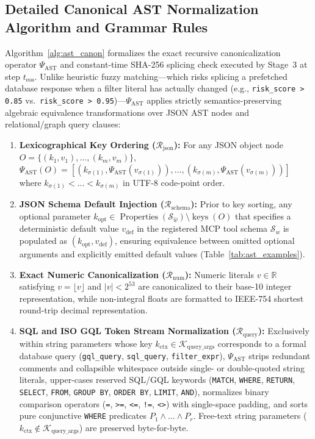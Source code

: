 \documentclass[10pt,conference]{IEEEtran}
\begin{document}
\subsection{Detailed Canonical AST Normalization Algorithm and Grammar Rules}
Algorithm~\ref{alg:ast_canon} formalizes the exact recursive canonicalization operator $\Psi_{\text{AST}}$ and constant-time SHA-256 splicing check executed by Stage~3 at step $t_{\text{eos}}$. Unlike heuristic fuzzy matching---which risks splicing a prefetched database response when a filter literal has actually changed (e.g., \texttt{risk\_score > 0.85} vs.\ \texttt{risk\_score > 0.95})---$\Psi_{\text{AST}}$ applies strictly semantics-preserving algebraic equivalence transformations over JSON AST nodes and relational/graph query clauses:
\begin{enumerate}
    \item \textbf{Lexicographical Key Ordering ($\mathcal{R}_{\text{json}}$):} For any JSON object node $O = \{(k_1, v_1), \dots, (k_m, v_m)\}$, $\Psi_{\text{AST}}(O) = [(k_{\sigma(1)}, \Psi_{\text{AST}}(v_{\sigma(1)})), \dots, (k_{\sigma(m)}, \Psi_{\text{AST}}(v_{\sigma(m)}))]$ where $k_{\sigma(1)} < \dots < k_{\sigma(m)}$ in UTF-8 code-point order.
    \item \textbf{JSON Schema Default Injection ($\mathcal{R}_{\text{schema}}$):} Prior to key sorting, any optional parameter $k_{\text{opt}} \in \operatorname{Properties}(\mathcal{S}_{\hat{w}}) \setminus \operatorname{keys}(O)$ that specifies a deterministic default value $v_{\text{def}}$ in the registered MCP tool schema $\mathcal{S}_{\hat{w}}$ is populated as $(k_{\text{opt}}, v_{\text{def}})$, ensuring equivalence between omitted optional arguments and explicitly emitted default values (Table~\ref{tab:ast_examples}).
    \item \textbf{Exact Numeric Canonicalization ($\mathcal{R}_{\text{num}}$):} Numeric literals $v \in \mathbb{R}$ satisfying $v = \lfloor v \rfloor$ and $|v| < 2^{53}$ are canonicalized to their base-10 integer representation, while non-integral floats are formatted to IEEE-754 shortest round-trip decimal representation.
    \item \textbf{SQL and ISO GQL Token Stream Normalization ($\mathcal{R}_{\text{query}}$):} Exclusively within string parameters whose key $k_{\text{ctx}} \in \mathcal{K}_{\text{query\_args}}$ corresponds to a formal database query (\texttt{gql\_query}, \texttt{sql\_query}, \texttt{filter\_expr}), $\Psi_{\text{AST}}$ strips redundant comments and collapsible whitespace outside single- or double-quoted string literals, upper-cases reserved SQL/GQL keywords (\texttt{MATCH}, \texttt{WHERE}, \texttt{RETURN}, \texttt{SELECT}, \texttt{FROM}, \texttt{GROUP BY}, \texttt{ORDER BY}, \texttt{LIMIT}, \texttt{AND}), normalizes binary comparison operators (\texttt{=}, \texttt{>=}, \texttt{<=}, \texttt{!=}, \texttt{<>}) with single-space padding, and sorts pure conjunctive \texttt{WHERE} predicates $P_1 \wedge \dots \wedge P_r$. Free-text string parameters ($k_{\text{ctx}} \notin \mathcal{K}_{\text{query\_args}}$) are preserved byte-for-byte.
\end{enumerate}
\end{document}
